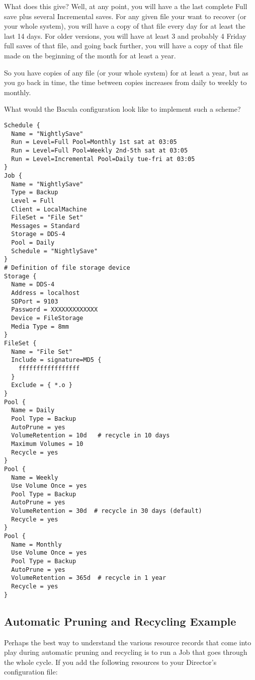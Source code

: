 What does this give? Well, at any point, you will have a the last complete
Full save plus several Incremental saves. For any given file your want to
recover (or your whole system), you will have a copy of that file every day
for at least the last 14 days. For older versions, you will have at least 3
and probably 4 Friday full saves of that file, and going back further, you
will have a copy of that file made on the beginning of the month for at least
a year. 

So you have copies of any file (or your whole system) for at least a year, but
as you go back in time, the time between copies increases from daily to weekly
to monthly. 

What would the Bacula configuration look like to implement such a scheme? 

\footnotesize
\begin{verbatim}
Schedule {
  Name = "NightlySave"
  Run = Level=Full Pool=Monthly 1st sat at 03:05
  Run = Level=Full Pool=Weekly 2nd-5th sat at 03:05
  Run = Level=Incremental Pool=Daily tue-fri at 03:05
}
Job {
  Name = "NightlySave"
  Type = Backup
  Level = Full
  Client = LocalMachine
  FileSet = "File Set"
  Messages = Standard
  Storage = DDS-4
  Pool = Daily
  Schedule = "NightlySave"
}
# Definition of file storage device
Storage {
  Name = DDS-4
  Address = localhost
  SDPort = 9103
  Password = XXXXXXXXXXXXX
  Device = FileStorage
  Media Type = 8mm
}
FileSet {
  Name = "File Set"
  Include = signature=MD5 {
    fffffffffffffffff
  }
  Exclude = { *.o }
}
Pool {
  Name = Daily
  Pool Type = Backup
  AutoPrune = yes
  VolumeRetention = 10d   # recycle in 10 days
  Maximum Volumes = 10
  Recycle = yes
}
Pool {
  Name = Weekly
  Use Volume Once = yes
  Pool Type = Backup
  AutoPrune = yes
  VolumeRetention = 30d  # recycle in 30 days (default)
  Recycle = yes
}
Pool {
  Name = Monthly
  Use Volume Once = yes
  Pool Type = Backup
  AutoPrune = yes
  VolumeRetention = 365d  # recycle in 1 year
  Recycle = yes
}
\end{verbatim}
\normalsize

\subsection*{ Automatic Pruning and Recycling Example}
\label{PruningExample}

Perhaps the best way to understand the various resource records that come into
play during automatic pruning and recycling is to run a Job that goes through
the whole cycle. If you add the following resources to your Director's
configuration file: 

